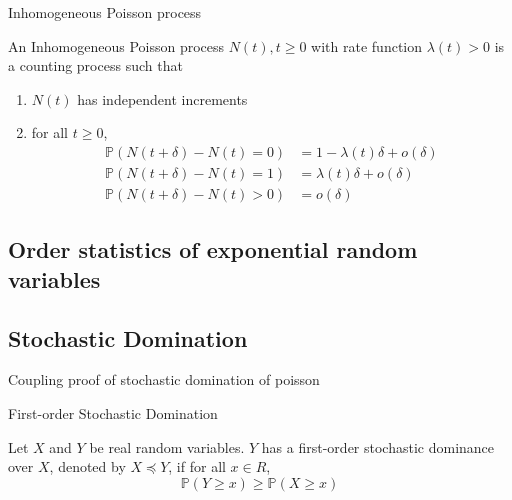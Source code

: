 \begin{definition}
	Inhomogeneous Poisson process

	\noindent
	An Inhomogeneous Poisson process ${N(t), t \geq 0}$ with rate function $\lambda(t) > 0$ is a counting process such that
	\begin{enumerate}
		\item $N(t)$ has independent increments
		\item for all $t \geq 0$, 
		\begin{align*}
			\mathbb{P}(N(t + \delta) - N(t) = 0) &= 1 - \lambda(t)\delta + o(\delta) \\
			\mathbb{P}(N(t + \delta) - N(t) = 1) &= \lambda(t)\delta + o(\delta) \\
			\mathbb{P}(N(t + \delta) - N(t) > 0) &= o(\delta)
		\end{align*}
	\end{enumerate}
\end{definition}


\subsection{Order statistics of exponential random variables}



\subsection{Stochastic Domination}
Coupling proof of stochastic domination of poisson 



\begin{definition}
	First-order Stochastic Domination

	\noindent
	Let $X$ and $Y$ be real random variables. $Y$ has a first-order stochastic dominance over $X$, denoted by $X \preceq Y$, if for all $x \in R$, 
	$$
		\mathbb{P}(Y \geq x) \geq \mathbb{P}(X \geq x)
	$$
\end{definition}


